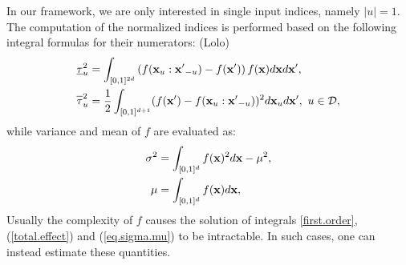 In our framework, we are only interested in single input indices, namely $|u|=1$. The computation of the normalized indices is performed based on the following integral formulas for their numerators:
{\color{purple}(Lolo)
\begin{align}
\label{first.order}
\underline{\tau}_u^2  &= \int_{[0,1]^{2d}} \left(
f(\vx_u:{\vx'}_{-u})-f(\vx')\right)f(\vx)d\vx d{\vx'}, \\
\label{total.effect}
\ov{$\tau$}_u^2 &= \frac{1}{2}\int_{[0,1]^{d+1}}(f(\vx')-f(\vx_u:{\vx'}_{-u}))^2 d\vx_u d{\vx'}, \ u \in \mathcal{D},
\end{align}
}
while variance and mean of $f$ are evaluated as:
\begin{gather}
\begin{aligned}
\sigma^2 &= \int_{[0,1]^{d}} f(\boldsymbol{\mathbf{x}})^2d{\boldsymbol{\mathbf{x}}} - \mu^2, \\
 \mu &= \int_{[0,1]^{d}} f(\boldsymbol{\mathbf{x}}) d{\boldsymbol{\mathbf{x}}},
\label{eq.sigma.mu}
\end{aligned}
\end{gather}
Usually the complexity of $f$ causes the solution of integrals \eqref{first.order}, (\ref{total.effect}) and (\ref{eq.sigma.mu}) to be intractable. In such cases, one can instead estimate these quantities.

